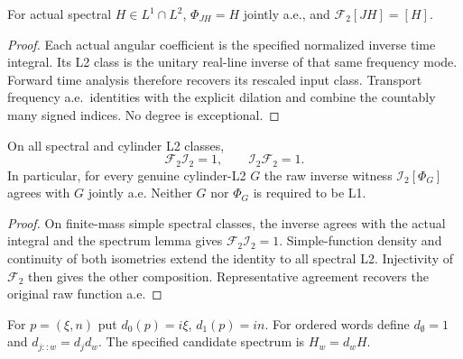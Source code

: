 \begin{lemma}
\label{lem:cylinder-synthesis-spectrum}
\leanok
For actual spectral $H\in L^1\cap L^2$,
$\Phi_{JH}=H$ jointly a.e., and $\mathcal F_2[JH]=[H]$.
\end{lemma}

\begin{proof}
\leanok
Each actual angular coefficient is the specified normalized inverse time integral.
Its L2 class is the unitary real-line inverse of that same frequency mode.
Forward time analysis therefore recovers its rescaled input class.
Transport frequency a.e.\ identities with the explicit dilation and combine
the countably many signed indices. No degree is exceptional.
\end{proof}

\begin{lemma}
\label{lem:cylinder-fourier-roundtrip}
\leanok
On all spectral and cylinder L2 classes,
\[
 \mathcal F_2\mathcal I_2=1,\qquad \mathcal I_2\mathcal F_2=1.
\]
In particular, for every genuine cylinder-L2 $G$ the raw inverse witness
$\mathcal I_2[\Phi_G]$ agrees with $G$ jointly a.e.
Neither $G$ nor $\Phi_G$ is required to be L1.
\end{lemma}

\begin{proof}
\leanok
On finite-mass simple spectral classes, the inverse agrees with the actual
integral and the spectrum lemma gives $\mathcal F_2\mathcal I_2=1$.
Simple-function density and continuity of both isometries extend the identity
to all spectral L2. Injectivity of $\mathcal F_2$ then gives the other composition.
Representative agreement recovers the original raw function a.e.
\end{proof}

\begin{definition}
\label{def:cylinder-spectral-jets}
\leanok
For $p=(\xi,n)$ put $d_0(p)=i\xi$, $d_1(p)=in$.
For ordered words define $d_\emptyset=1$ and $d_{j::w}=d_jd_w$.
The specified candidate spectrum is $H_w=d_wH$.
\end{definition}

